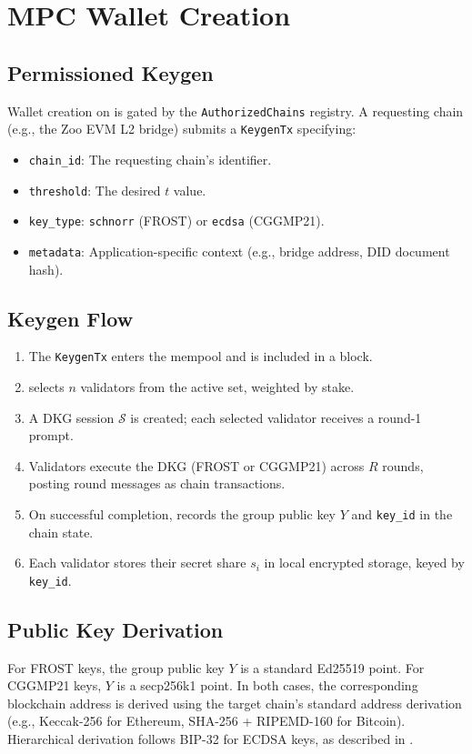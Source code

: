 \section{MPC Wallet Creation}

\label{sec:wallet}

\subsection{Permissioned Keygen}

Wallet creation on \TChain{} is gated by the \texttt{AuthorizedChains} registry. A requesting chain (e.g., the Zoo EVM L2 bridge) submits a \texttt{KeygenTx} specifying:

\begin{itemize}
\item \texttt{chain\_id}: The requesting chain's identifier.
\item \texttt{threshold}: The desired $t$ value.
\item \texttt{key\_type}: \texttt{schnorr} (FROST) or \texttt{ecdsa} (CGGMP21).
\item \texttt{metadata}: Application-specific context (e.g., bridge address, DID document hash).
\end{itemize}

\subsection{Keygen Flow}

\begin{enumerate}
\item The \texttt{KeygenTx} enters the \ThresholdVM{} mempool and is included in a block.
\item \ThresholdVM{} selects $n$ validators from the active set, weighted by stake.
\item A DKG session $\mathcal{S}$ is created; each selected validator receives a round-1 prompt.
\item Validators execute the DKG (FROST or CGGMP21) across $R$ rounds, posting round messages as chain transactions.
\item On successful completion, \ThresholdVM{} records the group public key $Y$ and \texttt{key\_id} in the chain state.
\item Each validator stores their secret share $s_i$ in local encrypted storage, keyed by \texttt{key\_id}.
\end{enumerate}

\subsection{Public Key Derivation}

For FROST keys, the group public key $Y$ is a standard Ed25519 point. For CGGMP21 keys, $Y$ is a secp256k1 point. In both cases, the corresponding blockchain address is derived using the target chain's standard address derivation (e.g., Keccak-256 for Ethereum, SHA-256 + RIPEMD-160 for Bitcoin). Hierarchical derivation follows BIP-32 for ECDSA keys, as described in \cite{zoo-key-management}.

